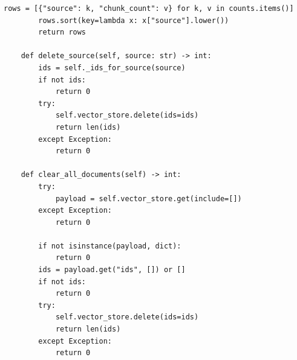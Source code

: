 \documentclass[12pt,a4paper]{article}
\begin{document}
\begin{lstlisting}[caption={database.py}]
        rows = [{"source": k, "chunk_count": v} for k, v in counts.items()]
        rows.sort(key=lambda x: x["source"].lower())
        return rows

    def delete_source(self, source: str) -> int:
        ids = self._ids_for_source(source)
        if not ids:
            return 0
        try:
            self.vector_store.delete(ids=ids)
            return len(ids)
        except Exception:
            return 0

    def clear_all_documents(self) -> int:
        try:
            payload = self.vector_store.get(include=[])
        except Exception:
            return 0

        if not isinstance(payload, dict):
            return 0
        ids = payload.get("ids", []) or []
        if not ids:
            return 0
        try:
            self.vector_store.delete(ids=ids)
            return len(ids)
        except Exception:
            return 0
\end{lstlisting}
\end{document}
